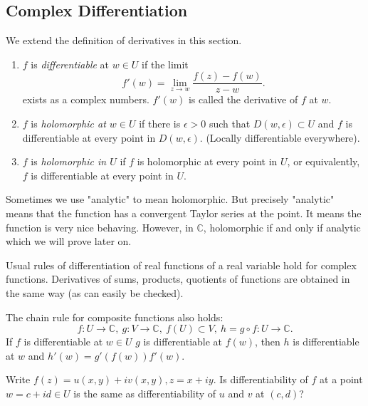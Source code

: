 \subsection{Complex Differentiation}
We extend the definition of derivatives in this section.
\begin{definition}{}{}
    \begin{enumerate}
        We have some definitions of differentiation in \(\mathbb{C}\) .
        \item \(f\) is \textit{differentiable} at \(w \in U\) if the limit
        \[
            f'(w)=\lim\limits_{z \to w}\frac{f(z)-f(w)}{z-w}.
        \]
        exists as a complex numbers. \(f'(w)\) is called the derivative of \(f\) at \(w\).
        \item \(f\) is \textit{holomorphic at \(w \in U\)} if there is \(\epsilon>0\) such that \(D(w, \epsilon) \subset U\) and \(f\) is differentiable at every point in \(D(w, \epsilon)\). (Locally differentiable everywhere).
        \item \(f\)  is \textit{holomorphic in \(U\)} if \(f\) is holomorphic at every point in \(U\), or equivalently, \(f\) is differentiable at every point in \(U\).
    \end{enumerate}
\end{definition}
\begin{remark}
    Sometimes we use "analytic" to mean holomorphic. But precisely "analytic" means that the function has a convergent Taylor series at the point. It means the function is very nice behaving. However, in \(\mathbb{C}\), holomorphic if and only if analytic which we will prove later on.
\end{remark}
Usual rules of differentiation of real functions of a real variable hold for complex functions. Derivatives of sums, products, quotients of functions are obtained in the same way (as can easily be checked).

The chain rule for composite functions also holds:
\[
    f:U\to\mathbb{C},~g:V\to \mathbb{C},~f(U)\subset V,~h=g\circ f:U \to \mathbb{C}.
\]
If \(f\) is differentiable at \(w \in U\) \(g\) is differentiable at \(f(w)\), then \(h\) is differentiable at \(w\) and \(h'(w)=g'(f(w))f'(w)\).

\begin{problem}
    Write \(f(z) = u(x,y)+iv(x,y),z=x+iy\). Is differentiability of \(f\) at a point \(w = c + id \in U\) is the same as differentiability of \(u\) and \(v\) at \((c,d)\)?
\end{problem}

